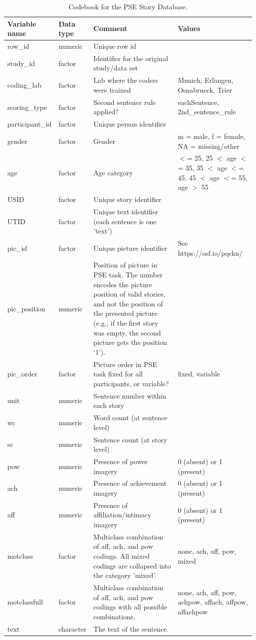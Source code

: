 \documentclass[man,a4paper,mask]{apa6}\usepackage[]{graphicx}\usepackage[]{color}
\begin{document}
\begin{table}
\begin{threeparttable}
		\caption{Codebook for the PSE Story Database.}
		\label{tab:codebook}
		\footnotesize
		\begin{tabularx}{\textwidth}{llXX}
		\toprule
Variable name & Data type & Comment & Values \\ 
  \hline
row\_id & numeric & Unique row id &  \\ 
  study\_id & factor & Identifier for the original study/data set &  \\ 
  coding\_lab & factor & Lab where the coders were trained & Munich, Erlangen, Osnabrueck, Trier \\ 
  scoring\_type & factor & Second sentence rule applied? & eachSentence, 2nd\_sentence\_rule \\ 
  participant\_id & factor & Unique person identifier &  \\ 
  gender & factor & Gender & m = male, f = female, NA = missing/other \\ 
  age & factor & Age category & $<$= 25, 25 $<$ age $<$= 35, 35 $<$ age $<$= 45, 45 $<$ age $<$= 55, age $>$ 55 \\ 
  USID & factor & Unique story identifier &  \\ 
  UTID & factor & Unique text identifier (each sentence is one 'text') &  \\ 
  pic\_id & factor & Unique picture identifier & See https://osf.io/pqckn/ \\ 
  pic\_position & numeric & Position of picture in PSE task. The number encodes the picture position of valid stories, and not the position of the presented picture (e.g., if the first story was empty, the second picture gets the position `1'). &  \\ 
  pic\_order & factor & Picture order in PSE task fixed for all participants, or variable? & fixed, variable \\ 
  unit & numeric & Sentence number within each story &  \\ 
  wc & numeric & Word count (at sentence level) &  \\ 
  sc & numeric & Sentence count (at story level) &  \\ 
  pow & numeric & Presence of power imagery & 0 (absent) or 1 (present) \\ 
  ach & numeric & Presence of achievement imagery & 0 (absent) or 1 (present) \\ 
  aff & numeric & Presence of affiliation/intimacy imagery & 0 (absent) or 1 (present) \\ 
  motclass & factor & Multiclass combination of aff, ach, and pow codings. All mixed codings are collapsed into the category 'mixed'. & none, ach, aff, pow, mixed \\ 
  motclassfull & factor & Multiclass combination of aff, ach, and pow codings with all possible combinations. & none, ach, aff, pow, achpow, affach, affpow, affachpow \\ 
  text & character & The text of the sentence. &  \\ 
   \hline


\end{tabularx}
\end{threeparttable}
\end{table}
\end{document}
